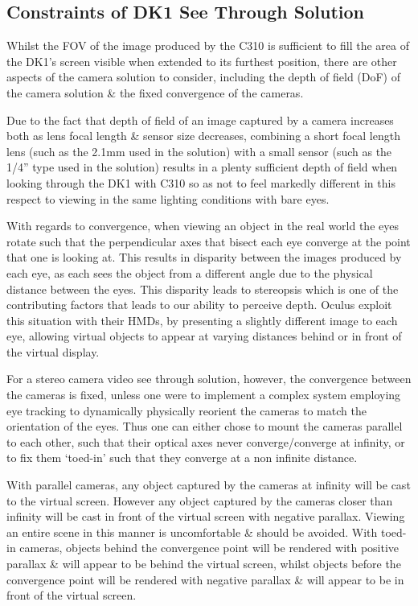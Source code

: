 
\subsection{Constraints of DK1 See Through Solution}

\label{constraints_of_dk1_see_through_solution}

Whilst the FOV of the image produced by the C310 is sufficient to fill the area of the DK1's screen visible when extended to its furthest position, there are other aspects of the camera solution to consider, including the depth of field (DoF) of the camera solution \& the fixed convergence of the cameras.

Due to the fact that depth of field of an image captured by a camera increases both as lens focal length \& sensor size decreases, combining a short focal length lens (such as the 2.1mm used in the solution) with a small sensor (such as the 1/4'' type used in the solution) results in a plenty sufficient depth of field when looking through the DK1 with C310 so as not to feel markedly different in this respect to viewing in the same lighting conditions with bare eyes.

With regards to convergence, when viewing an object in the real world the eyes rotate such that the perpendicular axes that bisect each eye converge at the point that one is looking at. This results in disparity between the images produced by each eye, as each sees the object from a different angle due to the physical distance between the eyes. This disparity leads to stereopsis which is one of the contributing factors that leads to our ability to perceive depth. Oculus exploit this situation with their HMDs, by presenting a slightly different image to each eye, allowing virtual objects to appear at varying distances behind or in front of the virtual display.

For a stereo camera video see through solution, however, the convergence between the cameras is fixed, unless one were to implement a complex system employing eye tracking to dynamically physically reorient the cameras to match the orientation of the eyes. Thus one can either chose to mount the cameras parallel to each other, such that their optical axes never converge/converge at infinity, or to fix them `toed-in' such that they converge at a non infinite distance.

With parallel cameras, any object captured by the cameras at infinity will be cast to the virtual screen. However any object captured by the cameras closer than infinity will be cast in front of the virtual screen with negative parallax. Viewing an entire scene in this manner is uncomfortable \& should be avoided. With toed-in cameras, objects behind the convergence point will be rendered with positive parallax \& will appear to be behind the virtual screen, whilst objects before the convergence point will be rendered with negative parallax \& will appear to be in front of the virtual screen.

